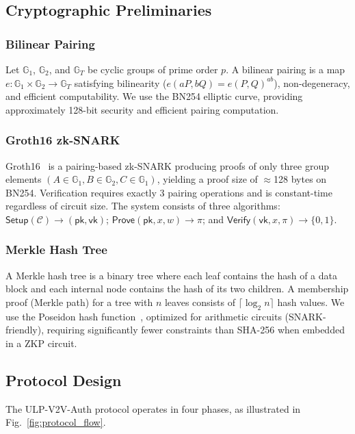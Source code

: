 \subsection{Cryptographic Preliminaries}

\subsubsection{Bilinear Pairing}
Let $\mathbb{G}_1$, $\mathbb{G}_2$, and $\mathbb{G}_T$ be cyclic groups of prime
order $p$. A bilinear pairing is a map $e: \mathbb{G}_1 \times \mathbb{G}_2
\rightarrow \mathbb{G}_T$ satisfying bilinearity ($e(aP, bQ) = e(P, Q)^{ab}$),
non-degeneracy, and efficient computability. We use the BN254 elliptic curve,
providing approximately 128-bit security and efficient pairing computation.

\subsubsection{Groth16 zk-SNARK}
Groth16~\cite{groth2016} is a pairing-based zk-SNARK producing proofs of only three
group elements $(A \in \mathbb{G}_1, B \in \mathbb{G}_2, C \in \mathbb{G}_1)$,
yielding a proof size of $\approx$128 bytes on BN254. Verification requires exactly
3 pairing operations and is constant-time regardless of circuit size. The system
consists of three algorithms: $\mathsf{Setup}(\mathcal{C}) \rightarrow (\mathsf{pk},
\mathsf{vk})$; $\mathsf{Prove}(\mathsf{pk}, x, w) \rightarrow \pi$; and
$\mathsf{Verify}(\mathsf{vk}, x, \pi) \rightarrow \{0, 1\}$.

\subsubsection{Merkle Hash Tree}
A Merkle hash tree is a binary tree where each leaf contains the hash of a data block
and each internal node contains the hash of its two children. A membership proof
(Merkle path) for a tree with $n$ leaves consists of $\lceil \log_2 n \rceil$ hash
values. We use the Poseidon hash function~\cite{poseidon2021}, optimized for
arithmetic circuits (SNARK-friendly), requiring significantly fewer constraints
than SHA-256 when embedded in a ZKP circuit.

\subsection{Protocol Design}

The ULP-V2V-Auth protocol operates in four phases, as illustrated in
Fig.~\ref{fig:protocol_flow}.

